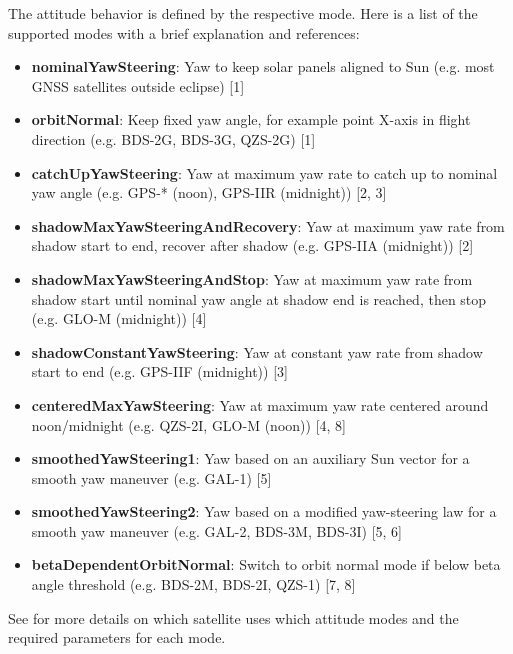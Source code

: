 The attitude behavior is defined by the respective mode. Here is a list of the supported
modes with a brief explanation and references:
\begin{itemize}
\item \textbf{nominalYawSteering}:
      Yaw to keep solar panels aligned to Sun (e.g. most GNSS satellites outside eclipse) [1]
\item \textbf{orbitNormal}:
      Keep fixed yaw angle, for example point X-axis in flight direction (e.g. BDS-2G, BDS-3G, QZS-2G) [1]
\item \textbf{catchUpYawSteering}:
      Yaw at maximum yaw rate to catch up to nominal yaw angle (e.g. GPS-* (noon), GPS-IIR (midnight)) [2, 3]
\item \textbf{shadowMaxYawSteeringAndRecovery}:
      Yaw at maximum yaw rate from shadow start to end, recover after shadow (e.g. GPS-IIA (midnight)) [2]
\item \textbf{shadowMaxYawSteeringAndStop}:
      Yaw at maximum yaw rate from shadow start until nominal yaw angle at shadow end is reached,
      then stop (e.g. GLO-M (midnight)) [4]
\item \textbf{shadowConstantYawSteering}:
      Yaw at constant yaw rate from shadow start to end (e.g. GPS-IIF (midnight)) [3]
\item \textbf{centeredMaxYawSteering}:
      Yaw at maximum yaw rate centered around noon/midnight (e.g. QZS-2I, GLO-M (noon)) [4, 8]
\item \textbf{smoothedYawSteering1}:
      Yaw based on an auxiliary Sun vector for a smooth yaw maneuver (e.g. GAL-1) [5]
\item \textbf{smoothedYawSteering2}:
      Yaw based on a modified yaw-steering law for a smooth yaw maneuver (e.g. GAL-2, BDS-3M, BDS-3I) [5, 6]
\item \textbf{betaDependentOrbitNormal}:
      Switch to orbit normal mode if below beta angle threshold (e.g. BDS-2M, BDS-2I, QZS-1) [7, 8]
\end{itemize}


See  for more details on which satellite uses which attitude modes
and the required parameters for each mode.

